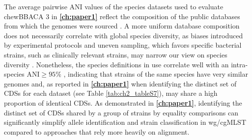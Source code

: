 The average pairwise \ac{ANI} values of the species datasets used to evaluate chewBBACA 3 in \textbf{\autoref{ch:paper1}} reflect the composition of the public databases from which the genomes were sourced \cite{oleary_reference_2016, blackwell_exploring_2021}. A more uniform database composition does not necessarily correlate with global species diversity, as biases introduced by experimental protocols and uneven sampling, which favors specific bacterial strains, such as clinically relevant strains, may narrow our view on species diversity \cite{isaac_bias_2015, albright_trait_2023, ross_characterizing_2013, boers_understanding_2019}. Nonetheless, the species definitions in use correlate well with an intra-species ANI$\geq95\%$ \cite{rodriguez-r_ani_2023, jain_high_2018, castillo-ramirez_road_nodate, konstantinidis_sequence-discrete_2023, rossello-mora_past_2015, murray_re-evaluating_2021}, indicating that strains of the same species have very similar genomes and, as reported in \textbf{\autoref{ch:paper1}} when identifying the distinct set of \acp{CDS} for each dataset (see Table \ref{tab:ch2_tableS7}), may share a high proportion of identical \acp{CDS}. As demonstrated in \textbf{\autoref{ch:paper1}}, identifying the distinct set of \acp{CDS} shared by a group of strains by equality comparisons can significantly simplify allele identification and strain classification in \ac{wg/cgMLST} compared to approaches that rely more heavily on alignment.

